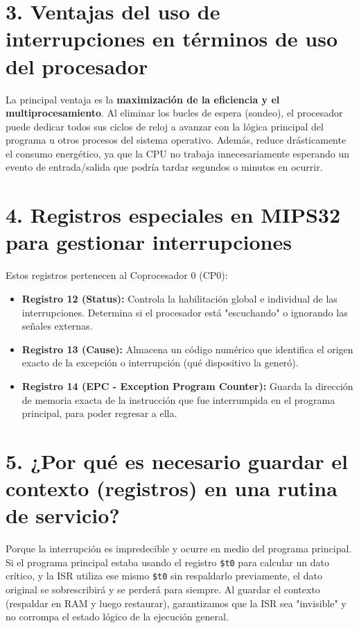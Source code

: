 \documentclass[12pt,a4paper]{article}
\begin{document}
\section*{3. Ventajas del uso de interrupciones en términos de uso del procesador}
La principal ventaja es la \textbf{maximización de la eficiencia y el multiprocesamiento}. Al eliminar los bucles de espera (sondeo), el procesador puede dedicar todos sus ciclos de reloj a avanzar con la lógica principal del programa u otros procesos del sistema operativo. Además, reduce drásticamente el consumo energético, ya que la CPU no trabaja innecesariamente esperando un evento de entrada/salida que podría tardar segundos o minutos en ocurrir.

\section*{4. Registros especiales en MIPS32 para gestionar interrupciones}
Estos registros pertenecen al Coprocesador 0 (CP0):
\begin{itemize}
    \item \textbf{Registro 12 (Status):} Controla la habilitación global e individual de las interrupciones. Determina si el procesador está "escuchando" o ignorando las señales externas.
    \item \textbf{Registro 13 (Cause):} Almacena un código numérico que identifica el origen exacto de la excepción o interrupción (qué dispositivo la generó).
    \item \textbf{Registro 14 (EPC - Exception Program Counter):} Guarda la dirección de memoria exacta de la instrucción que fue interrumpida en el programa principal, para poder regresar a ella.
\end{itemize}

\section*{5. ¿Por qué es necesario guardar el contexto (registros) en una rutina de servicio?}
Porque la interrupción es impredecible y ocurre en medio del programa principal. Si el programa principal estaba usando el registro \texttt{\$t0} para calcular un dato crítico, y la ISR utiliza ese mismo \texttt{\$t0} sin respaldarlo previamente, el dato original se sobrescribirá y se perderá para siempre. Al guardar el contexto (respaldar en RAM y luego restaurar), garantizamos que la ISR sea "invisible" y no corrompa el estado lógico de la ejecución general.
\end{document}
